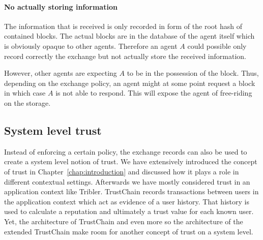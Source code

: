 \paragraph{No actually storing information}
The information that is received is only recorded in form of the root hash of contained blocks. The 
actual blocks are in the database of the agent itself which is obviously opaque to other agents. 
Therefore an agent $A$ could possible only record correctly the exchange but not actually store the 
received information. 

However, other agents are expecting $A$ to be in the possession of the block. Thus, depending 
on the exchange policy, an agent might at some point request a block in which case $A$ is not able 
to respond. This will expose the agent of free-riding on the storage.


\subsection{System level trust}
\label{sec:system_trust}
Instead of enforcing a certain policy, the exchange records can also be used to create a system level 
notion of trust. We have extensively introduced the concept of trust in Chapter~\ref{chap:introduction} and discussed
how it plays a role in different contextual settings. Afterwards we have mostly considered trust in 
an application context like Tribler. TrustChain records transactions between users in the application
context which act as evidence of a user history. That history is used to calculate a reputation and
ultimately a trust value for each known user. Yet, the architecture of TrustChain and even more so 
the architecture of the extended TrustChain make room for another concept of trust on a system level.

